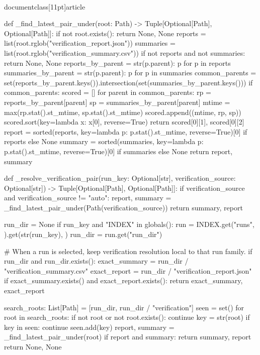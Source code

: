 \\documentclass[11pt]{article}
\begin{document}
\begin{CodeBlock}
{def _find_latest_pair_under(root: Path) -> Tuple[Optional[Path], Optional[Path]]:
    if not root.exists():
        return None, None
    reports = list(root.rglob("verification_report.json"))
    summaries = list(root.rglob("verification_summary.csv"))
    if not reports and not summaries:
        return None, None
    reports_by_parent = {str(p.parent): p for p in reports}
    summaries_by_parent = {str(p.parent): p for p in summaries}
    common_parents = set(reports_by_parent.keys()).intersection(set(summaries_by_parent.keys()))
    if common_parents:
        scored = []
        for parent in common_parents:
            rp = reports_by_parent[parent]
            sp = summaries_by_parent[parent]
            mtime = max(rp.stat().st_mtime, sp.stat().st_mtime)
            scored.append((mtime, rp, sp))
        scored.sort(key=lambda x: x[0], reverse=True)
        return scored[0][1], scored[0][2]
    report = sorted(reports, key=lambda p: p.stat().st_mtime, reverse=True)[0] if reports else None
    summary = sorted(summaries, key=lambda p: p.stat().st_mtime, reverse=True)[0] if summaries else None
    return report, summary


def _resolve_verification_pair(run_key: Optional[str], verification_source: Optional[str]) -> Tuple[Optional[Path], Optional[Path]]:
    if verification_source and verification_source != "auto":
        report, summary = _find_latest_pair_under(Path(verification_source))
        return summary, report

    run_dir = None
    if run_key and "INDEX" in globals():
        run = INDEX.get("runs", {}).get(str(run_key), {})
        run_dir = run.get("run_dir")

    # When a run is selected, keep verification resolution local to that run family.
    if run_dir and run_dir.exists():
        exact_summary = run_dir / "verification_summary.csv"
        exact_report = run_dir / "verification_report.json"
        if exact_summary.exists() and exact_report.exists():
            return exact_summary, exact_report

        search_roots: List[Path] = [run_dir, run_dir / "verification"]
        seen = set()
        for root in search_roots:
            if not root or not root.exists():
                continue
            key = str(root)
            if key in seen:
                continue
            seen.add(key)
            report, summary = _find_latest_pair_under(root)
            if report and summary:
                return summary, report
        return None, None

}
\end{CodeBlock}
\end{document}

